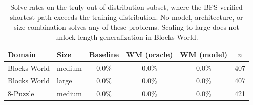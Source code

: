 \begin{table}[t]
\centering
\caption{Solve rates on the truly out-of-distribution subset, where the BFS-verified shortest path exceeds the training distribution. No model, architecture, or size combination solves any of these problems. Scaling to large does not unlock length-generalization in Blocks World.}
\label{tab:truly-ood}
\begin{tabular}{llcccc}
\toprule
Domain & Size & Baseline & WM (oracle) & WM (model) & $n$ \\
\midrule
Blocks World & medium & 0.0\% & 0.0\% & 0.0\% & 407 \\
Blocks World & large & 0.0\% & 0.0\% & 0.0\% & 407 \\
8-Puzzle & medium & 0.0\% & 0.0\% & 0.0\% & 421 \\
\bottomrule
\end{tabular}
\end{table}

